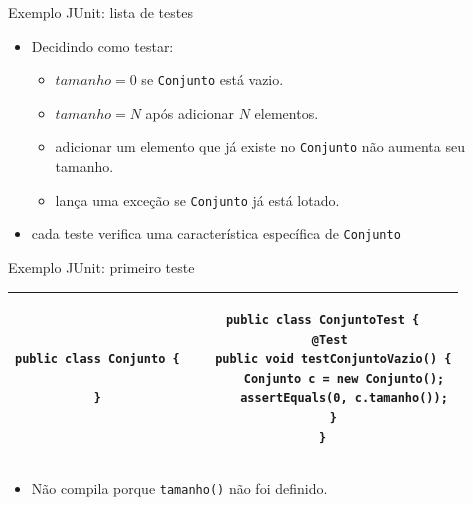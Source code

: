 \documentclass[handout]{beamer}
\begin{document}
\begin{frame}{Exemplo JUnit: lista de testes}

\begin{itemize}
\item Decidindo como testar:
\begin{itemize}
\item $tamanho=0$ se \lstinline|Conjunto| está vazio.
\item $tamanho=N$ após adicionar $N$ elementos.
\item adicionar um elemento que já existe no \lstinline|Conjunto| não aumenta seu tamanho.
\item lança uma exceção se \lstinline|Conjunto| já está lotado.
\end{itemize}
\item cada teste verifica uma característica específica de \lstinline|Conjunto|
\end{itemize}
\end{frame}


\begin{frame}[fragile]{Exemplo JUnit: primeiro teste}

\begin{tabular}{|c|c|}
\hline
\begin{minipage}{.35\textwidth}
\begin{lstlisting}
public class Conjunto {

}
\end{lstlisting}
\end{minipage} &
\begin{minipage}{.55\textwidth}
\begin{lstlisting}
public class ConjuntoTest {
   @Test 
   public void testConjuntoVazio() {
      Conjunto c = new Conjunto();
      assertEquals(0, c.tamanho());
   }
}
\end{lstlisting}
\end{minipage} \\ \hline
\end{tabular}

\begin{itemize}
\item Não compila porque \lstinline|tamanho()| não foi definido.
\end{itemize}

\end{frame}
\end{document}
